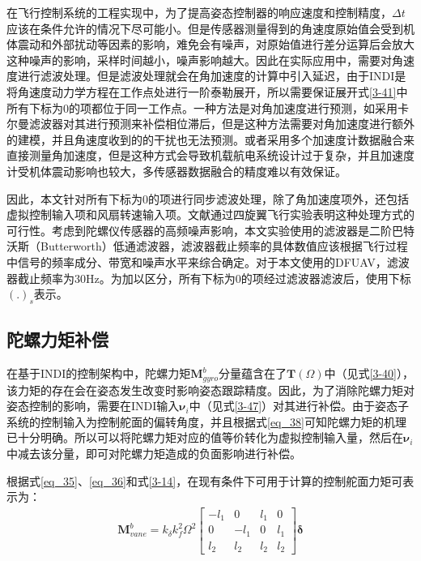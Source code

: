 在飞行控制系统的工程实现中，为了提高姿态控制器的响应速度和控制精度，$\Delta t$应该在条件允许的情况下尽可能小。但是传感器测量得到的角速度原始值会受到机体震动和外部扰动等因素的影响，难免会有噪声，对原始值进行差分运算后会放大这种噪声的影响，采样时间越小，噪声影响越大。因此在实际应用中，需要对角速度进行滤波处理。但是滤波处理就会在角加速度的计算中引入延迟，由于INDI是将角速度动力学方程在工作点处进行一阶泰勒展开，所以需要保证展开式\eqref{3-41}中所有下标为0的项都位于同一工作点。一种方法是对角加速度进行预测，如采用卡尔曼滤波器对其进行预测来补偿相位滞后，但是这种方法需要对角加速度进行额外的建模，并且角速度收到的的干扰也无法预测。或者采用多个加速度计数据融合来直接测量角加速度，但是这种方式会导致机载航电系统设计过于复杂，并且加速度计受机体震动影响也较大，多传感器数据融合的精度难以有效保证。

因此，本文针对所有下标为0的项进行同步滤波处理，除了角加速度项外，还包括虚拟控制输入项和风扇转速输入项。文献\parencite{smeurAdaptiveIncrementalNonlinear2015,smeurCascadedIncrementalNonlinear2018b}通过四旋翼飞行实验表明这种处理方式的可行性。考虑到陀螺仪传感器的高频噪声影响，本文实验使用的滤波器是二阶巴特沃斯（Butterworth）低通滤波器，滤波器截止频率的具体数值应该根据飞行过程中信号的频率成分、带宽和噪声水平来综合确定。对于本文使用的DFUAV，滤波器截止频率为30Hz。为加以区分，所有下标为0的项经过滤波器滤波后，使用下标$(.)_s$表示。

\subsection{陀螺力矩补偿}

在基于INDI的控制架构中，陀螺力矩$\boldsymbol{M}_{gyro}^b$分量蕴含在了$\boldsymbol{T}(\Omega)$中（见式\eqref{3-40}），该力矩的存在会在姿态发生改变时影响姿态跟踪精度。因此，为了消除陀螺力矩对姿态控制的影响，需要在INDI输入$\boldsymbol{\nu}_i$中（见式\eqref{3-47}）对其进行补偿。由于姿态子系统的控制输入为控制舵面的偏转角度，并且根据式\eqref{eq_38}可知陀螺力矩的机理已十分明确。所以可以将陀螺力矩对应的值等价转化为虚拟控制输入量，然后在$\boldsymbol{\nu}_i$中减去该分量，即可对陀螺力矩造成的负面影响进行补偿。

根据式\eqref{eq_35}、\eqref{eq_36}和式\eqref{3-14}，在现有条件下可用于计算的控制舵面力矩可表示为：
\begin{gather}
    \boldsymbol{M}_{vane}^b=k_{\delta}k_f^2\Omega^2\begin{bmatrix}
        -l_1 & 0 & l_1 & 0 \\
        0 & -l_1 & 0 & l_1 \\
        l_2 & l_2 & l_2 & l_2
        \end{bmatrix}\boldsymbol{{\delta}}
    \label{3-50}
\end{gather}

